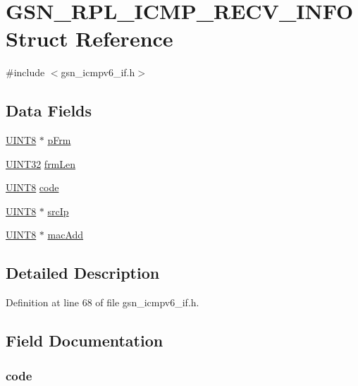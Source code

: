 \hypertarget{a00201}{
\section{GSN\_\-RPL\_\-ICMP\_\-RECV\_\-INFO Struct Reference}
\label{a00201}
}


{\ttfamily \#include $<$gsn\_\-icmpv6\_\-if.h$>$}

\subsection*{Data Fields}
\begin{DoxyCompactItemize}
\item 
\hyperlink{a00660_gab27e9918b538ce9d8ca692479b375b6a}{UINT8} $\ast$ \hyperlink{a00201_afba54a5414ca77eb7407764ab9341418}{pFrm}
\item 
\hyperlink{a00660_gae1e6edbbc26d6fbc71a90190d0266018}{UINT32} \hyperlink{a00201_a2a4cb35bdb3091065000a921b7a482d5}{frmLen}
\item 
\hyperlink{a00660_gab27e9918b538ce9d8ca692479b375b6a}{UINT8} \hyperlink{a00201_a05e88cead9be23006429d5237ec6be08}{code}
\item 
\hyperlink{a00660_gab27e9918b538ce9d8ca692479b375b6a}{UINT8} $\ast$ \hyperlink{a00201_a2be5dd6bedefa93f1b4ea430bf6b92c6}{srcIp}
\item 
\hyperlink{a00660_gab27e9918b538ce9d8ca692479b375b6a}{UINT8} $\ast$ \hyperlink{a00201_aae2284ac385006def342fdc83d48d136}{macAdd}
\end{DoxyCompactItemize}


\subsection{Detailed Description}


Definition at line 68 of file gsn\_\-icmpv6\_\-if.h.



\subsection{Field Documentation}
\hypertarget{a00201_a05e88cead9be23006429d5237ec6be08}{
\subsubsection[{code}]{ {\bf code}}}
\label{a00201_a05e88cead9be23006429d5237ec6be08}



